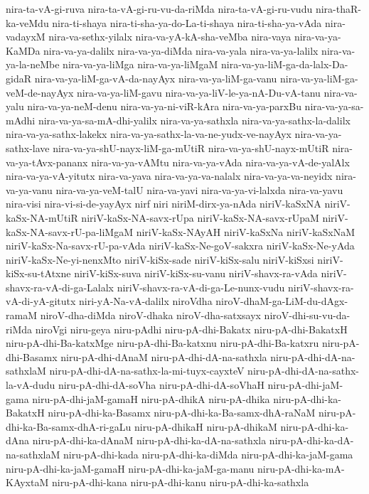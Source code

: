 {nira-ta-vA-gi-ruva
nira-ta-vA-gi-ru-vu-da-riMda
nira-ta-vA-gi-ru-vudu
nira-thaR-ka-veMdu
nira-ti-shaya
nira-ti-sha-ya-do-La-ti-shaya
nira-ti-sha-ya-vAda
nira-vadayxM
nira-va-sethx-yilalx
nira-va-yA-kA-sha-veMba
nira-vaya
nira-va-ya-KaMDa
nira-va-ya-dalilx
nira-va-ya-diMda
nira-va-yala
nira-va-ya-lalilx
nira-va-ya-la-neMbe
nira-va-ya-liMga
nira-va-ya-liMgaM
nira-va-ya-liM-ga-da-lalx-Da-gidaR
nira-va-ya-liM-ga-vA-da-nayAyx
nira-va-ya-liM-ga-vanu
nira-va-ya-liM-ga-veM-de-nayAyx
nira-va-ya-liM-gavu
nira-va-ya-liV-le-ya-nA-Du-vA-tanu
nira-va-yalu
nira-va-ya-neM-denu
nira-va-ya-ni-viR-kAra
nira-va-ya-parxBu
nira-va-ya-sa-mAdhi
nira-va-ya-sa-mA-dhi-yalilx
nira-va-ya-sathxla
nira-va-ya-sathx-la-dalilx
nira-va-ya-sathx-lakekx
nira-va-ya-sathx-la-va-ne-yudx-ve-nayAyx
nira-va-ya-sathx-lave
nira-va-ya-shU-nayx-liM-ga-mUtiR
nira-va-ya-shU-nayx-mUtiR
nira-va-ya-tAvx-pananx
nira-va-ya-vAMtu
nira-va-ya-vAda
nira-va-ya-vA-de-yalAlx
nira-va-ya-vA-yitutx
nira-va-yava
nira-va-ya-va-nalalx
nira-va-ya-va-neyidx
nira-va-ya-vanu
nira-va-ya-veM-talU
nira-va-yavi
nira-va-ya-vi-lalxda
nira-va-yavu
nira-visi
nira-vi-si-de-yayAyx
nirf
niri
niriM-dirx-ya-nAda
niriV-kaSxNA
niriV-kaSx-NA-mUtiR
niriV-kaSx-NA-savx-rUpa
niriV-kaSx-NA-savx-rUpaM
niriV-kaSx-NA-savx-rU-pa-liMgaM
niriV-kaSx-NAyAH
niriV-kaSxNa
niriV-kaSxNaM
niriV-kaSx-Na-savx-rU-pa-vAda
niriV-kaSx-Ne-goV-sakxra
niriV-kaSx-Ne-yAda
niriV-kaSx-Ne-yi-nenxMto
niriV-kiSx-sade
niriV-kiSx-salu
niriV-kiSxsi
niriV-kiSx-su-tAtxne
niriV-kiSx-suva
niriV-kiSx-su-vanu
niriV-shavx-ra-vAda
niriV-shavx-ra-vA-di-ga-Lalalx
niriV-shavx-ra-vA-di-ga-Le-nunx-vudu
niriV-shavx-ra-vA-di-yA-gitutx
niri-yA-Na-vA-dalilx
niroVdha
niroV-dhaM-ga-LiM-du-dAgx-ramaM
niroV-dha-diMda
niroV-dhaka
niroV-dha-satxsayx
niroV-dhi-su-vu-da-riMda
niroVgi
niru-geya
niru-pAdhi
niru-pA-dhi-Bakatx
niru-pA-dhi-BakatxH
niru-pA-dhi-Ba-katxMge
niru-pA-dhi-Ba-katxnu
niru-pA-dhi-Ba-katxru
niru-pA-dhi-Basamx
niru-pA-dhi-dAnaM
niru-pA-dhi-dA-na-sathxla
niru-pA-dhi-dA-na-sathxlaM
niru-pA-dhi-dA-na-sathx-la-mi-tuyx-cayxteV
niru-pA-dhi-dA-na-sathx-la-vA-dudu
niru-pA-dhi-dA-soVha
niru-pA-dhi-dA-soVhaH
niru-pA-dhi-jaM-gama
niru-pA-dhi-jaM-gamaH
niru-pA-dhikA
niru-pA-dhika
niru-pA-dhi-ka-BakatxH
niru-pA-dhi-ka-Basamx
niru-pA-dhi-ka-Ba-samx-dhA-raNaM
niru-pA-dhi-ka-Ba-samx-dhA-ri-gaLu
niru-pA-dhikaH
niru-pA-dhikaM
niru-pA-dhi-ka-dAna
niru-pA-dhi-ka-dAnaM
niru-pA-dhi-ka-dA-na-sathxla
niru-pA-dhi-ka-dA-na-sathxlaM
niru-pA-dhi-kada
niru-pA-dhi-ka-diMda
niru-pA-dhi-ka-jaM-gama
niru-pA-dhi-ka-jaM-gamaH
niru-pA-dhi-ka-jaM-ga-manu
niru-pA-dhi-ka-mA-KAyxtaM
niru-pA-dhi-kana
niru-pA-dhi-kanu
niru-pA-dhi-ka-sathxla
}
